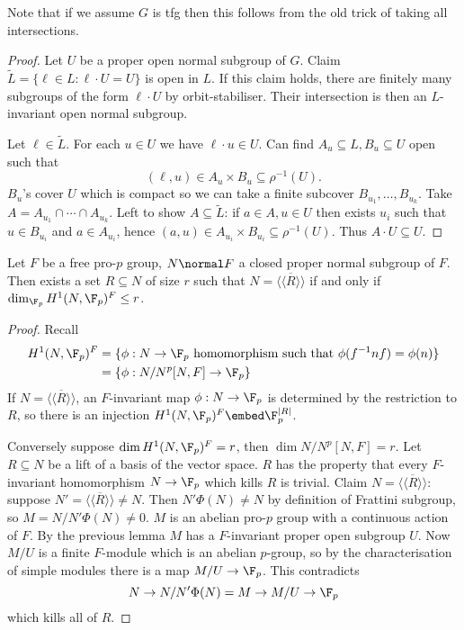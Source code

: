 \documentclass[a4paper]{article}
\begin{document}
Note that if we assume \(G\) is tfg then this follows from the old trick of taking all intersections.

\begin{proof}
  Let \(U\) be a proper open normal subgroup of \(G\). Claim \(\tilde L = \{\ell \in L: \ell \cdot U = U\}\) is open in \(L\). If this claim holds, there are finitely many subgroups of the form \(\ell \cdot U\) by orbit-stabiliser. Their intersection is then an \(L\)-invariant open normal subgroup.

  Let \(\ell \in \tilde L\). For each \(u \in U\) we have \(\ell \cdot u \in U\). Can find \(A_u \subseteq L, B_u \subseteq U\) open such that
  \[
    (\ell, u) \in A_u \times B_u \subseteq \rho^{-1}(U).
  \]
  \(B_u\)'s cover \(U\) which is compact so we can take a finite subcover \(B_{u_1}, \dots, B_{u_k}\). Take \(A = A_{u_1} \cap \cdots \cap A_{u_k}\). Left to show \(A \subseteq \tilde L\): if \(a \in A, u \in U\) then exists \(u_i\) such that \(u \in B_{u_i}\) and \(a \in A_{u_i}\), hence \((a, u) \in A_{u_i} \times B_{u_i} \subseteq \rho^{-1}(U)\). Thus \(A \cdot U \subseteq U\).
\end{proof}

\begin{lemma}
  Let \(F\) be a free pro-\(p\) group, \(N \normal F\) a closed proper normal subgroup of \(F\). Then exists a set \(R \subseteq N\) of size \(r\) such that \(N = \overline{\langle\langle R\rangle\rangle}\) if and only if \(\dim_{\F_p} H^1(N, \F_p)^F \leq r\).
\end{lemma}

\begin{proof}
  Recall
  \begin{align*}
    H^1(N, \F_p)^F
    &= \{\phi: N \to \F_p \text{ homomorphism such that } \phi(f^{-1}nf) = \phi(n)\} \\
    &= \{\phi: N/N^p[N, F] \to \F_p\}
  \end{align*}
  If \(N = \overline{\langle\langle R\rangle\rangle}\), an \(F\)-invariant map \(\phi: N \to \F_p\) is determined by the restriction to \(R\), so there is an injection \(H^1(N, \F_p)^F \embed \F_p^{|R|}\).

  Conversely suppose \(\dim H^1(N, \F_p)^F = r\), then \(\dim N/N^p[N, F] = r\). Let \(R \subseteq N\) be a lift of a basis of the vector space. \(R\) has the property that every \(F\)-invariant homomorphism \(N \to \F_p\) which kills \(R\) is trivial. Claim \(N = \overline{\langle\langle R\rangle\rangle}\): suppose \(N' = \overline{\langle\langle R\rangle\rangle} \ne N\). Then \(N' \Phi(N) \ne N\) by definition of Frattini subgroup, so \(M = N/N'\Phi(N) \ne 0\). \(M\) is an abelian pro-\(p\) group with a continuous action of \(F\). By the previous lemma \(M\) has a \(F\)-invariant proper open subgroup \(U\). Now \(M/U\) is a finite \(F\)-module which is an abelian \(p\)-group, so by the characterisation of simple modules there is a map \(M/U \to \F_p\). This contradicts
  \[
    N \to N/N'\Phi(N) = M \to M/U \to \F_p
  \]
  which kills all of \(R\).
\end{proof}
\end{document}
